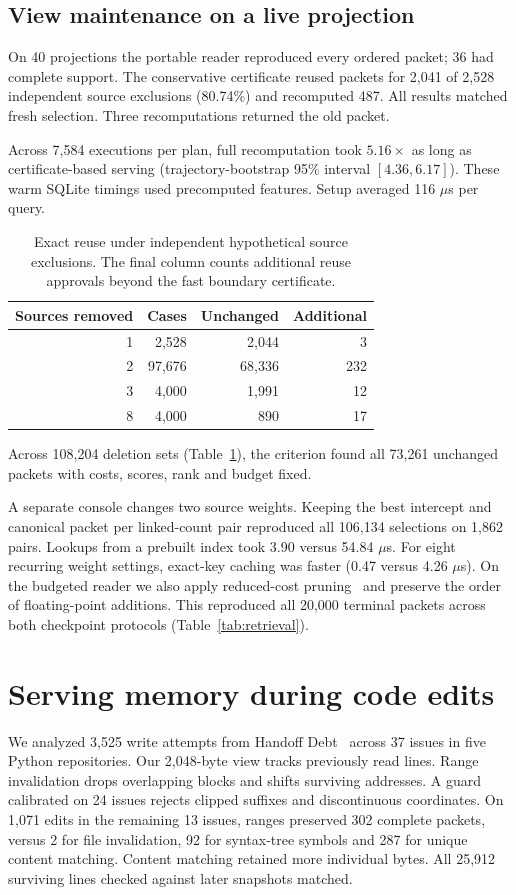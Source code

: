 \documentclass[conference]{IEEEtran}
\begin{document}
\subsection{View maintenance on a live projection}
On 40 projections the portable reader reproduced every ordered packet; 36 had complete support. The conservative certificate reused packets for 2,041 of 2,528 independent source exclusions (80.74\%) and recomputed 487. All results matched fresh selection. Three recomputations returned the old packet.

Across 7,584 executions per plan, full recomputation took $5.16\times$ as long as certificate-based serving (trajectory-bootstrap 95\% interval $[4.36,6.17]$). These warm SQLite timings used precomputed features. Setup averaged 116 $\mu$s per query. 

\balance
\begin{table}[t]
\caption{Exact reuse under independent hypothetical source exclusions. The final column counts additional reuse approvals beyond the fast boundary certificate.}
\centering\small
\begin{tabular}{rrrr}\toprule
Sources removed & Cases & Unchanged & Additional\\\midrule
1 & 2,528 & 2,044 & 3\\
2 & 97,676 & 68,336 & 232\\
3 & 4,000 & 1,991 & 12\\
8 & 4,000 & 890 & 17\\
\bottomrule\end{tabular}
\label{tab:exclusions}
\end{table}

Across 108,204 deletion sets (Table~\ref{tab:exclusions}), the criterion found all 73,261 unchanged packets with costs, scores, rank and budget fixed.

A separate console changes two source weights. Keeping the best intercept and canonical packet per linked-count pair reproduced all 106,134 selections on 1,862 pairs. Lookups from a prebuilt index took 3.90 versus 54.84 $\mu$s. For eight recurring weight settings, exact-key caching was faster (0.47 versus 4.26 $\mu$s). On the budgeted reader we also apply reduced-cost pruning~\cite{coreknap} and preserve the order of floating-point additions. This reproduced all 20,000 terminal packets across both checkpoint protocols (Table~\ref{tab:retrieval}).

\section{Serving memory during code edits}
We analyzed 3,525 write attempts from Handoff Debt~\cite{handoff} across 37 issues in five Python repositories. Our 2,048-byte view tracks previously read lines. Range invalidation drops overlapping blocks and shifts surviving addresses. A guard calibrated on 24 issues rejects clipped suffixes and discontinuous coordinates. On 1,071 edits in the remaining 13 issues, ranges preserved 302 complete packets, versus 2 for file invalidation, 92 for syntax-tree symbols and 287 for unique content matching. Content matching retained more individual bytes. All 25,912 surviving lines checked against later snapshots matched.
\end{document}
